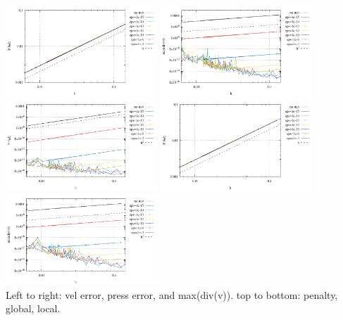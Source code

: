 \begin{center}
\includegraphics[width=5.7cm]{python_codes/fieldstone_115/results/aquarium/errorsP_global.pdf}
\includegraphics[width=5.7cm]{python_codes/fieldstone_115/results/aquarium/divv_global.pdf}\\
\includegraphics[width=5.7cm]{python_codes/fieldstone_115/results/aquarium/errorsV_local.pdf}
\includegraphics[width=5.7cm]{python_codes/fieldstone_115/results/aquarium/errorsP_local.pdf}
\includegraphics[width=5.7cm]{python_codes/fieldstone_115/results/aquarium/divv_local.pdf}\\
{\captionfont Left to right: vel error, press error, and max(div(v)). top to bottom: 
penalty, global, local.}
\end{center}


